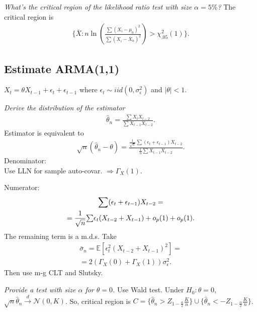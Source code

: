 \documentclass[9pt]{extarticle}
\newcommand{\EE}{\mathbb{E}}
\newcommand{\ssum}{\bgroup \textstyle \sum \egroup}
\newcommand{\darrow}{\overset{d}{\rightarrow}}
\begin{document}
\begin{multicols*}{4}
\emph{What’s the critical region of the likelihood ratio test with size $\alpha = 5\%$?}
The critical region is
\begin{gather*}
    \{\bar{X}:n \ln\left(\frac{\sum (X_i - \mu_0)^2}{\sum (X_i - \bar{X}_n)^2}\right) > \chi_{.05}^2(1)\}.
\end{gather*}


\newcommand{\hu}{\hat{u}}
\newcommand{\htt}{\hat{\theta}}
\newcommand{\hrho}{\hat{\rho}}



\subsection*{Estimate ARMA(1,1)}
$X_t = \theta X_{t-1} + \epsilon_t + \epsilon_{t-1}$ where $\epsilon_t \sim iid(0, \sigma^2_\epsilon)$ and $|\theta| < 1$.

\emph{Derive the distribution of the estimator}
\begin{gather*}
    \htt_n = \frac{\sum X_t X_{t-2}}{\sum X_{t-1}X_{t-2}}.
\end{gather*}
Estimator is equivalent to
\begin{gather*}
    \sqrt{n}(\htt_n - \theta) = \frac{\frac{1}{\sqrt{n}} \sum(\epsilon_t + \epsilon_{t-1})X_{t-2}}{\frac{1}{n} \sum X_{t-1}X_{t-2}}.
\end{gather*}
Denominator: \\
Use LLN for sample auto-covar. $\Rightarrow \Gamma_X(1)$.

Numerator:
\begin{gather*}
    \sum(\epsilon_t + \epsilon_{t-1})X_{t-2} = \\
    = \frac{1}{\sqrt{n}} \ssum \epsilon_t(X_{t-2} + X_{t-1}) + o_p(1) + o_p(1).
\end{gather*}
The remaining term is a m.d.s. Take 
\begin{gather*}
    \bar{\sigma}_n = \EE[\epsilon_t^2(X_{t-2} + X_{t-1})^2] = \\
    = 2(\Gamma_X(0) +\Gamma_X(1))\sigma_{\epsilon}^2.
\end{gather*}
Then use m-g CLT and Slutsky.

\emph{Provide a test with size $\alpha$ for $\theta = 0$.}
Use Wald test. Under $H_0: \theta = 0$, $\sqrt{n}\htt_n \darrow \mathcal{N}(0, K)$. So, critical region is $C = \{\htt_n > Z_{1-\frac{\alpha}{2}} \frac{K}{n} \} \cup \{\htt_n < -Z_{1-\frac{\alpha}{2}} \frac{K}{n} \}$.






\end{multicols*}
\end{document}
